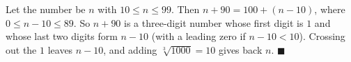 Let the number be $n$ with $10\le n\le99$. Then $n+90=100+(n-10)$, where $0\le n-10\le89$. So $n+90$ is a three-digit number whose first digit is $1$ and whose last two digits form $n-10$ (with a leading zero if $n-10<10$). Crossing out the $1$ leaves $n-10$, and adding $\sqrt[3]{1000}=10$ gives back $n$. $\blacksquare$
